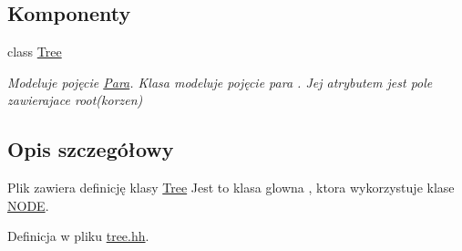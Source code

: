 \subsection*{Komponenty}
\begin{DoxyCompactItemize}
\item 
class \hyperlink{class_tree}{Tree}
\begin{DoxyCompactList}\small\item\em Modeluje pojęcie \hyperlink{class_para}{Para}. Klasa modeluje pojęcie para . Jej atrybutem jest pole zawierajace root(korzen) \end{DoxyCompactList}\end{DoxyCompactItemize}


\subsection{Opis szczegółowy}
Plik zawiera definicję klasy \hyperlink{class_tree}{Tree} Jest to klasa glowna , ktora wykorzystuje klase \hyperlink{class_n_o_d_e}{N\-O\-D\-E}. 

Definicja w pliku \hyperlink{tree_8hh_source}{tree.\-hh}.

